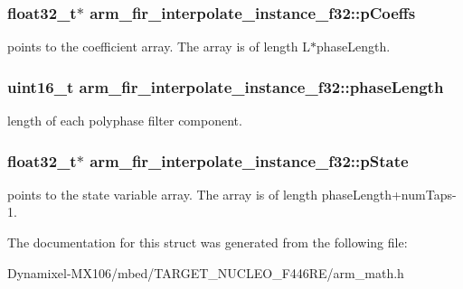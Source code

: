 \subsubsection[{\texorpdfstring{p\+Coeffs}{pCoeffs}}]{\setlength{\rightskip}{0pt plus 5cm}float32\+\_\+t$\ast$ arm\+\_\+fir\+\_\+interpolate\+\_\+instance\+\_\+f32\+::p\+Coeffs}\hypertarget{structarm__fir__interpolate__instance__f32_a86053b715980a93c9df630d6de5bb63c}{}\label{structarm__fir__interpolate__instance__f32_a86053b715980a93c9df630d6de5bb63c}
points to the coefficient array. The array is of length L$\ast$phase\+Length. 
\subsubsection[{\texorpdfstring{phase\+Length}{phaseLength}}]{\setlength{\rightskip}{0pt plus 5cm}uint16\+\_\+t arm\+\_\+fir\+\_\+interpolate\+\_\+instance\+\_\+f32\+::phase\+Length}\hypertarget{structarm__fir__interpolate__instance__f32_a389e669e13ec56292a70db8e92194b12}{}\label{structarm__fir__interpolate__instance__f32_a389e669e13ec56292a70db8e92194b12}
length of each polyphase filter component. 
\subsubsection[{\texorpdfstring{p\+State}{pState}}]{\setlength{\rightskip}{0pt plus 5cm}float32\+\_\+t$\ast$ arm\+\_\+fir\+\_\+interpolate\+\_\+instance\+\_\+f32\+::p\+State}\hypertarget{structarm__fir__interpolate__instance__f32_a42a8ba1bda85fa86d7b6c84d3da4c75b}{}\label{structarm__fir__interpolate__instance__f32_a42a8ba1bda85fa86d7b6c84d3da4c75b}
points to the state variable array. The array is of length phase\+Length+num\+Taps-\/1. 

The documentation for this struct was generated from the following file\+:\begin{DoxyCompactItemize}
\item 
Dynamixel-\/\+M\+X106/mbed/\+T\+A\+R\+G\+E\+T\+\_\+\+N\+U\+C\+L\+E\+O\+\_\+\+F446\+R\+E/arm\+\_\+math.\+h\end{DoxyCompactItemize}
